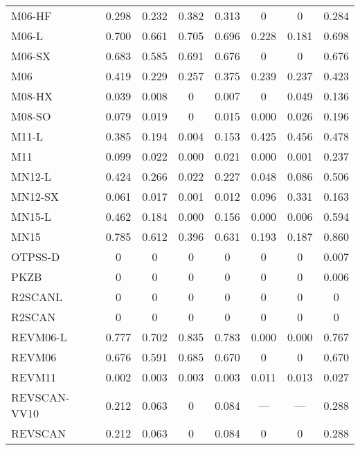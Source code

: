 \begin{table*}
\begin{tabular}{|l|c|c|c|c|c|c|c|}
M06-HF~\cite{Zhao2006_13126} & 0.298 & 0.232 & 0.382 & 0.313 & 0 & 0 & 0.284 \\
M06-L~\cite{Zhao2006_194101,Zhao2008_215} & 0.700 & 0.661 & 0.705 & 0.696 & 0.228 & 0.181 & 0.698 \\
M06-SX~\cite{Wang2020_2294} & 0.683 & 0.585 & 0.691 & 0.676 & 0 & 0 & 0.676 \\
M06~\cite{Zhao2008_215} & 0.419 & 0.229 & 0.257 & 0.375 & 0.239 & 0.237 & 0.423 \\
M08-HX~\cite{Zhao2008_1849} & 0.039 & 0.008 & 0 & 0.007 & 0 & 0.049 & 0.136 \\
M08-SO~\cite{Zhao2008_1849} & 0.079 & 0.019 & 0 & 0.015 & 0.000 & 0.026 & 0.196 \\
M11-L~\cite{Peverati2012_117} & 0.385 & 0.194 & 0.004 & 0.153 & 0.425 & 0.456 & 0.478 \\
M11~\cite{Peverati2011_2810} & 0.099 & 0.022 & 0.000 & 0.021 & 0.000 & 0.001 & 0.237 \\
MN12-L~\cite{Peverati2012_13171} & 0.424 & 0.266 & 0.022 & 0.227 & 0.048 & 0.086 & 0.506 \\
MN12-SX~\cite{Peverati2012_16187} & 0.061 & 0.017 & 0.001 & 0.012 & 0.096 & 0.331 & 0.163 \\
MN15-L~\cite{Yu2016_1280} & 0.462 & 0.184 & 0.000 & 0.156 & 0.000 & 0.006 & 0.594 \\
MN15~\cite{Yu2016_5032} & 0.785 & 0.612 & 0.396 & 0.631 & 0.193 & 0.187 & 0.860 \\
OTPSS-D~\cite{Goerigk2010_107} & 0 & 0 & 0 & 0 & 0 & 0 & 0.007 \\
PKZB~\cite{Perdew1999_2544} & 0 & 0 & 0 & 0 & 0 & 0 & 0.006 \\
R2SCANL~\cite{Mejia2020_121109,Furness2020_8208,Furness2020_9248} & 0 & 0 & 0 & 0 & 0 & 0 & 0 \\
R2SCAN~\cite{Furness2020_8208,Furness2020_9248} & 0 & 0 & 0 & 0 & 0 & 0 & 0 \\
REVM06-L~\cite{Wang2017_8487} & 0.777 & 0.702 & 0.835 & 0.783 & 0.000 & 0.000 & 0.767 \\
REVM06~\cite{Wang2018_10257} & 0.676 & 0.591 & 0.685 & 0.670 & 0 & 0 & 0.670 \\
REVM11~\cite{Verma2019_2966} & 0.002 & 0.003 & 0.003 & 0.003 & 0.011 & 0.013 & 0.027 \\
REVSCAN-VV10~\cite{Mezei2018_2469} & 0.212 & 0.063 & 0 & 0.084 & --- & --- & 0.288 \\
REVSCAN~\cite{Mezei2018_2469} & 0.212 & 0.063 & 0 & 0.084 & 0 & 0 & 0.288 \\

\end{tabular}
\end{table*}
